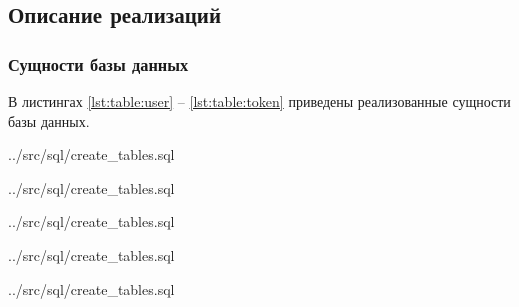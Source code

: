 \subsection{Описание реализаций}

\subsubsection{Сущности базы данных}

В листингах \ref{lst:table:user} -- \ref{lst:table:token} приведены реализованные сущности базы данных.

\begin{code}
    \begin{lstinputlisting}[
            label={lst:table:user},
            caption={Создание User},
            firstline=2,
            lastline=10,
        ]{../src/sql/create_tables.sql}
    \end{lstinputlisting}
\end{code}

\begin{code}
    \begin{lstinputlisting}[
            caption={Создание Document},
            firstline=13,
            lastline=21,
        ]{../src/sql/create_tables.sql}
    \end{lstinputlisting}
\end{code}

\begin{code}
    \begin{lstinputlisting}[
            caption={Создание DocumentAuthor},
            firstline=24,
            lastline=27,
        ]{../src/sql/create_tables.sql}
    \end{lstinputlisting}
\end{code}

\begin{code}
    \begin{lstinputlisting}[
            caption={Создание Author},
            firstline=30,
            lastline=37,
        ]{../src/sql/create_tables.sql}
    \end{lstinputlisting}
\end{code}

\begin{code}
    \begin{lstinputlisting}[
            caption={Создание AnnotationTask},
            firstline=40,
            lastline=48,
        ]{../src/sql/create_tables.sql}
    \end{lstinputlisting}
\end{code}

